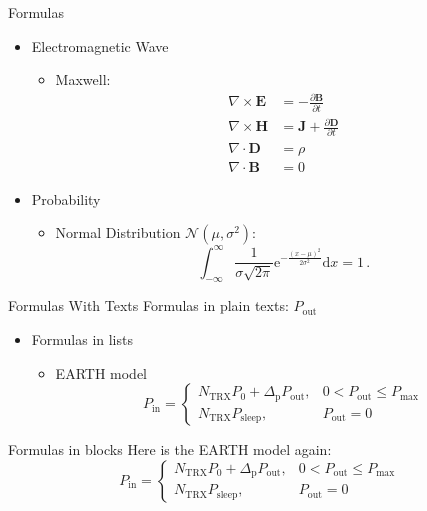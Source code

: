 \documentclass[onlycurpagenum,infolines,xcolor=table]{beamer}
\begin{document}
\begin{frame}{Formulas}
  \begin{itemize}
    \item Electromagnetic Wave
      \begin{itemize}
        \item Maxwell:
          \begin{align}
            \nabla \times \mathbf{E} & = - \frac{\partial
            \mathbf{B}}{\partial t}\\
            \nabla \times \mathbf{H} & = \mathbf{J} +
            \frac{\partial \mathbf{D}}{\partial t}\\
            \nabla \cdot \mathbf{D} & = \rho \\
            \nabla \cdot\mathbf{B} & = 0
            \label{eqn:maxwell}
          \end{align}
      \end{itemize}
    \item Probability
      \begin{itemize}
        \item Normal Distribution $\mathcal{N}(\mu,\sigma^2)$:
          \[
          \int_{-\infty}^{\infty}\frac{1}{\sigma\sqrt{2\pi}}\mathrm{e}^{-\frac{(x-\mu)^2}{2\sigma^2}}\mathrm{d}x= 1 \, .
          \]
      \end{itemize}
  \end{itemize}
\end{frame}

\begin{frame}{Formulas With Texts}
  Formulas in plain texts: {\rmfamily $P_\text{out}$}
  \begin{itemize}
    \item Formulas in lists
      \begin{itemize}
        \item EARTH model
\begin{equation}
  P_\text{in} = \begin{cases}
    N_{\text{TRX}} P_0 + \Delta_\text{p} P_\text{out}, & 0 < P_\text{out} \le P_\text{max} \\
    N_{\text{TRX}} P_\text{sleep}, & P_\text{out} = 0
  \end{cases}
\end{equation}
      \end{itemize}
  \end{itemize}
  \begin{exampleblock}{Formulas in blocks}
    Here is the EARTH model again:\rmfamily
\begin{equation}
  P_\text{in} = \begin{cases}
    N_{\text{TRX}} P_0 + \Delta_\text{p} P_\text{out}, & 0 < P_\text{out} \le P_\text{max} \\
    N_{\text{TRX}} P_\text{sleep}, & P_\text{out} = 0
  \end{cases}
\end{equation}
  \end{exampleblock}
\end{frame}
\end{document}
